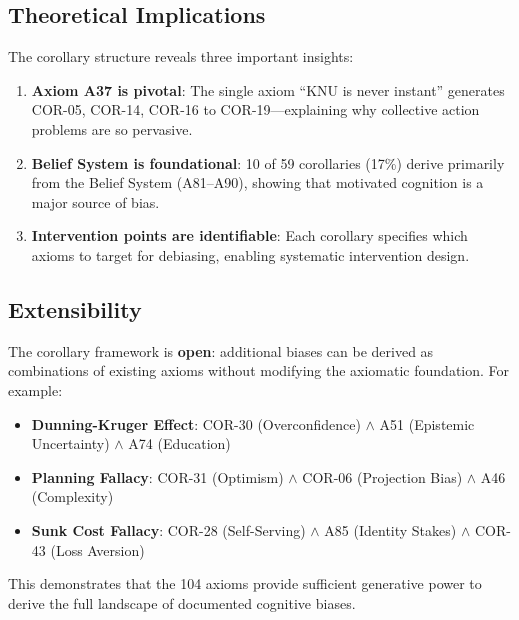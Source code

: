 \subsection{Theoretical Implications}

The corollary structure reveals three important insights:

\begin{enumerate}
    \item \textbf{Axiom A37 is pivotal}: The single axiom ``KNU is never instant'' generates COR-05, COR-14, COR-16 to COR-19---explaining why collective action problems are so pervasive.
    
    \item \textbf{Belief System is foundational}: 10 of 59 corollaries (17\%) derive primarily from the Belief System (A81--A90), showing that motivated cognition is a major source of bias.
    
    \item \textbf{Intervention points are identifiable}: Each corollary specifies which axioms to target for debiasing, enabling systematic intervention design.
\end{enumerate}

\subsection{Extensibility}

The corollary framework is \textbf{open}: additional biases can be derived as combinations of existing axioms without modifying the axiomatic foundation. For example:

\begin{itemize}
    \item \textbf{Dunning-Kruger Effect}: COR-30 (Overconfidence) $\land$ A51 (Epistemic Uncertainty) $\land$ A74 (Education)
    \item \textbf{Planning Fallacy}: COR-31 (Optimism) $\land$ COR-06 (Projection Bias) $\land$ A46 (Complexity)
    \item \textbf{Sunk Cost Fallacy}: COR-28 (Self-Serving) $\land$ A85 (Identity Stakes) $\land$ COR-43 (Loss Aversion)
\end{itemize}

This demonstrates that the 104 axioms provide sufficient generative power to derive the full landscape of documented cognitive biases.




